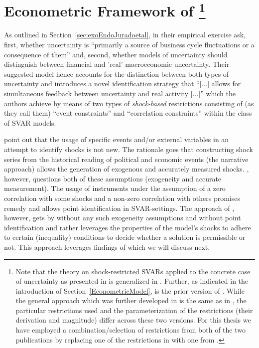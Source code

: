 \documentclass[a4paper,11pt,listof=nochaptergap,oneside,pointednumbers,bibtotoc,bigheadings,liststotoc,hidelinks]{scrbook}
\theoremstyle{mysatz}
\theoremstyle{mydefinition}
\theoremstyle{mytheorem}
\theoremstyle{mybemerkung}
\begin{document}
\section[Econometric Framework of \citep{ludvigsonetal:18,ludvigsonetal:19}]{Econometric Framework of \citep{ludvigsonetal:18,ludvigsonetal:19}\footnote{Note that the theory on shock-restricted SVARs applied to the concrete case of uncertainty as presented in \citep{ludvigsonetal:18,ludvigsonetal:19} is generalized in \citep{ludvigsonetal:17,ludvigsonetal:20a}. Further, as indicated in the introduction of Section~\ref{EconometricModel}, \citet{ludvigsonetal:18} is the prior version of \citet{ludvigsonetal:19}. While the general approach which was further developed in \citet{ludvigsonetal:19} is the same as in \citet{ludvigsonetal:18}, the particular restrictions used and the parameterization of the restrictions (their derivation and magnitude) differ across these two versions. For this thesis we have employed a combination/selection of restrictions from both of the two publications by replacing one of the restrictions in \citet{ludvigsonetal:19} with one from \citet{ludvigsonetal:18}.}}
\label{sec:econometricframeworkLMN}

As outlined in Section~\ref{sec:exoEndoJuradoetal}, in their empirical exercise \citet[p. 2]{ludvigsonetal:19} ask, first, whether uncertainty is ``primarily a source of business cycle fluctuations or a consequence of them'' and, second, whether models of uncertainty should distinguish between financial and 'real' macroeconomic uncertainty. Their suggested model hence accounts for the distinction between both types of uncertainty and introduces a novel identification strategy that ``[...] allows for simultaneous feedback between uncertainty and real activity [...]'' which the authors achieve by means of two types of \textit{shock-based} restrictions consisting of (as they call them) ``event constraints'' and ``correlation constraints'' within the class of SVAR models. 

\citet{ludvigsonetal:19} point out that the usage of specific events and/or external variables in an attempt to identify shocks is not new. The rationale goes that constructing shock series from the historical reading of political and economic events (the narrative approach) allows the generation of exogenous and accurately measured shocks. \citet{ramey:16}, however, questions both of these assumptions (exogeneity and accurate measurement). The usage of instruments under the assumption of a zero correlation with some shocks and a non-zero correlation with others promises remedy and allows point identification in SVAR-settings. The approach of \citet{ludvigsonetal:19}, however, gets by without any such exogeneity assumptions and without point identification and rather leverages the properties of the model's shocks to adhere to certain (inequality) conditions to decide whether a solution is permissible or not. This approach leverages findings of \citet{rubioetal:10} which we will discuss next.
\end{document}
